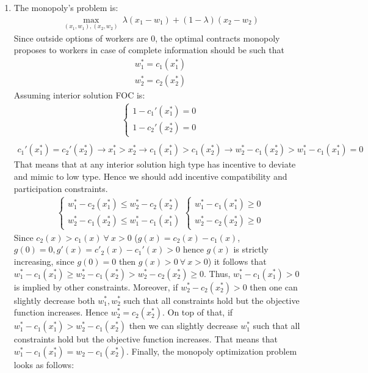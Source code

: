 \documentclass[a4paper]{article}
\begin{document}
\begin{enumerate}
	\item The monopoly's problem is:
	\begin{align*}
	\underset{(x_1, w_1), (x_2, w_2)}{\max}\ \lambda(x_1 - w_1) + (1 - \lambda)(x_2 - w_2)
	\end{align*}
	Since outside options of workers are 0, the optimal contracts monopoly proposes to workers in case of complete information should be such that
	\begin{align*}
	w_1^* = c_1(x_1^*)\\
	w_2^* = c_2(x_2^*)
	\end{align*}
	Assuming interior solution FOC is:
	\begin{align*}
	\begin{cases}
	1 - c_1'(x_1^*) = 0\\
	1 - c_2'(x_2^*) = 0
	\end{cases}\\
	\end{align*}
	\begin{align*}
	c_1'(x_1^*) = c_2'(x_2^*) \to x_1^* > x_2^* \to c_1(x_1^*) > c_1(x_2^*) \to w_2^* - c_1(x_2^*) > w_1^* - c_1(x_1^*) = 0
	\end{align*}
	That means that at any interior solution high type has incentive to deviate and mimic to low type. Hence we should add incentive compatibility and participation constraints.
	\begin{align*}
	\begin{cases}
	w_1^* - c_2(x_1^*) \le w_2^* - c_2(x_2^*)\\
	w_2^* - c_1(x_2^*) \le w_1^* - c_1(x_1^*)
	\end{cases}
	\begin{cases}
	w_1^* - c_1(x_1^*) \ge 0\\
	w_2^* - c_2(x_2^*) \ge 0
	\end{cases}
	\end{align*}
	Since $c_2(x) > c_1(x)\ \forall\ x > 0$ ($g(x) = c_2(x) - c_1(x)$, $g(0) = 0, g'(x) = c'_2(x) - c_1'(x) > 0$ hence $g(x)$ is strictly increasing, since $g(0) = 0$ then $g(x)>0\ \forall\ x > 0$) it follows that $w_1^* - c_1(x_1^*) \ge w_2^* - c_1(x_2^*) > w_2^* - c_2(x_2^*) \ge 0$. Thus, $w_1^*-c_1(x_1^*) > 0$ is implied by other constraints. Moreover, if $w_2^* - c_2(x_2^*) > 0$ then one can slightly decrease both $w_1^*, w_2^*$ such that all constraints hold but the objective function increases. Hence $w_2^* = c_2(x_2^*)$. On top of that, if $w_1^* - c_1(x_1^*) > w_2^* - c_1(x_2^*)$ then we can slightly decrease $w_1^*$ such that all constraints hold but the objective function increases. That means that $w_1^* - c_1(x_1^*) = w_2 - c_1(x_2^*)$. Finally, the monopoly optimization problem looks as follows:

\end{enumerate}
\end{document}

